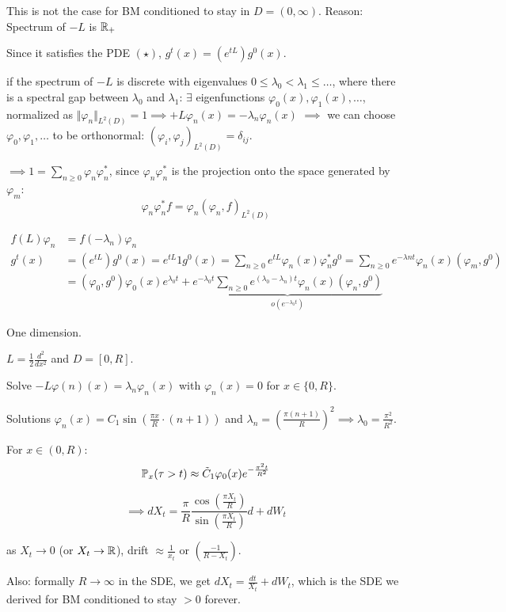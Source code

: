\begin{aremark}

    This is not the case for BM conditioned to stay in $D=(0,\infty)$. Reason: Spectrum of $-L$ is $\mathbb{R}_+$

\end{aremark}

Since it satisfies the PDE $(\star)$, $g^t(x)=(e^{tL})g^0(x)$.

if the spectrum of $-L$ is discrete with eigenvalues $0\leq \lambda_0<\lambda_1\leq \dots$, where 
there is a spectral gap between $\lambda_0$ and $\lambda_1$: $\exists$ eigenfunctions $\varphi_0(x),\varphi_1(x),\dots$,
normalized  as $\Vert \varphi_n\Vert_{L^2(D)}=1\implies +L\varphi_n(x)=-\lambda_n\varphi_n(x)$
$\implies$ we can choose $\varphi_0,\varphi_1,\dots$ to be orthonormal: $(\varphi_i,\varphi_j)_{L^2(D)}=\delta_{ij}$. 

$\implies 1=\sum_{n\geq 0}\varphi_n\varphi_n^*$, since $\varphi_n\varphi_n^*$ is the projection onto 
the space generated by $\varphi_m$:
\[\varphi_n\varphi_n^* f=\varphi_n (\varphi_n,f)_{L^2(D)}\]

\begin{align*}
    f(L)\varphi_n&=f(-\lambda_n)\varphi_n\\
    g^t(x)&=(e^{tL})g^0(x)=e^{tL}1g^0(x)=\sum_{n\geq 0}e^{tL}\varphi_n(x)\varphi_n^*g^0=\sum_{n\geq 0} e^{-\lambda n t}\varphi_n(x)(\varphi_m,g^0)\\
    &=(\varphi_0,g^0)\varphi_0(x)e^{\lambda_0t}+\underbrace{e^{-\lambda_0 t}\sum_{n\geq 0}e^{(\lambda_0-\lambda_n)t}\varphi_n(x)(\varphi_n,g^0)}_{o(e^{-\lambda_0 t})}
\end{align*}


\begin{example}
    One dimension.

    $L=\frac{1}{2}\frac{d^2}{dx^2}$ and $D=[0,R]$.

    Solve $-L\varphi(n)(x)=\lambda_n\varphi_n(x)$ with $\varphi_n(x)=0$ for $x\in \{0,R\}$.

    Solutions $\varphi_n(x)=C_1\sin\left(\frac{\pi x}{R}\cdot (n+1)\right)$
    and 
    $\lambda_n=\left(\frac{\pi(n+1)}{R}\right)^2\implies \lambda_0=\frac{\pi^2}{R^2}$.

    For $x\in(0,R):$\begin{align*}
        \mathbb{P}_x(\tau>t)\approx \tilde{C}_1 \varphi_0(x)e^{-\frac{\pi^2 t}{R^2}}
    \end{align*}

    \[\implies dX_t=\frac{\pi}{R}\frac{\cos(\frac{\pi X_t}{R})}{\sin(\frac{\pi X_t}{R})}d+dW_t\]

    as $X_t\to 0$ (or $X_t\to\mathbb{R}$), drift $\approx \frac{1}{x_t}$ or $(\frac{-1}{R-X_t})$.

    Also: formally $R\to\infty$ in the SDE, we get $dX_t=\frac{dt}{X_t}+dW_t$, which is the SDE 
    we derived for BM conditioned to stay $>0$ forever.
\end{example}


